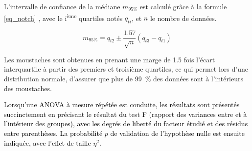 \begin{appendices}
	
	
	L'intervalle de confiance de la médiane $m_{95\%}$ est calculé grâce à la formule \cref{eq_notch} \parencite{mcgill_variations_1978}, avec le i\textsuperscript{ème} quartiles notés $q_{ti}$, et $n$ le nombre de données.
	
	\begin{equation}\label{eq_notch}
		m_{95\%} = q_{t2} \pm \frac{1.57}{\sqrt{n}}(q_{t3}-q_{t1})
	\end{equation}

	Les moustaches sont obtenues en prenant une marge de 1.5 fois l'écart interquartile à partir des premiers et troisième quartiles, ce qui permet lors d'une distribution normale, d'assurer que plus de \SI{99}{\percent} des données sont à l'intérieurs des moustaches.
	
	\textcolor{black}{Lorsqu'une ANOVA à mesure répétée est conduite, les résultats sont présentés succinctement en précisant le résultat du test F (rapport des variances entre et à l'intérieur des groupes), avec les degrés de liberté du facteur étudié et des résidus entre parenthèses. La probabilité $p$ de validation de l'hypothèse nulle est ensuite indiquée, avec l'effet de taille $\eta^2$.}
	

\end{appendices}
